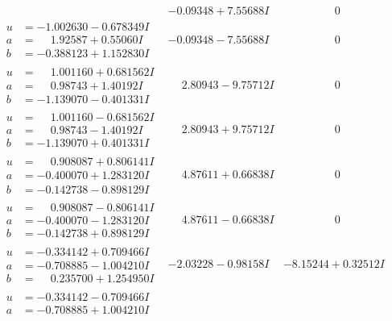 \documentclass[1p]{elsarticle_modified}
\theoremstyle{definition}
\begin{document}
$$\begin{array}{c|c|c}
 & -0.09348 + 7.55688 I & \phantom{-0.000000 } 0 \\ \hline\begin{aligned}
u &= -1.002630 - 0.678349 I \\
a &= \phantom{-}1.92587 + 0.55060 I \\
b &= -0.388123 + 1.152830 I\end{aligned}
 & -0.09348 - 7.55688 I & \phantom{-0.000000 } 0 \\ \hline\begin{aligned}
u &= \phantom{-}1.001160 + 0.681562 I \\
a &= \phantom{-}0.98743 + 1.40192 I \\
b &= -1.139070 - 0.401331 I\end{aligned}
 & \phantom{-}2.80943 - 9.75712 I & \phantom{-0.000000 } 0 \\ \hline\begin{aligned}
u &= \phantom{-}1.001160 - 0.681562 I \\
a &= \phantom{-}0.98743 - 1.40192 I \\
b &= -1.139070 + 0.401331 I\end{aligned}
 & \phantom{-}2.80943 + 9.75712 I & \phantom{-0.000000 } 0 \\ \hline\begin{aligned}
u &= \phantom{-}0.908087 + 0.806141 I \\
a &= -0.400070 + 1.283120 I \\
b &= -0.142738 - 0.898129 I\end{aligned}
 & \phantom{-}4.87611 + 0.66838 I & \phantom{-0.000000 } 0 \\ \hline\begin{aligned}
u &= \phantom{-}0.908087 - 0.806141 I \\
a &= -0.400070 - 1.283120 I \\
b &= -0.142738 + 0.898129 I\end{aligned}
 & \phantom{-}4.87611 - 0.66838 I & \phantom{-0.000000 } 0 \\ \hline\begin{aligned}
u &= -0.334142 + 0.709466 I \\
a &= -0.708885 - 1.004210 I \\
b &= \phantom{-}0.235700 + 1.254950 I\end{aligned}
 & -2.03228 - 0.98158 I & -8.15244 + 0.32512 I \\ \hline\begin{aligned}
u &= -0.334142 - 0.709466 I \\
a &= -0.708885 + 1.004210 I \\

\end{aligned}
\end{array}$$
\end{document}
